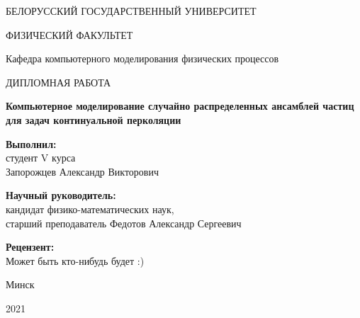 \begin{titlepage}
\begin{center}
БЕЛОРУССКИЙ ГОСУДАРСТВЕННЫЙ УНИВЕРСИТЕТ

ФИЗИЧЕСКИЙ ФАКУЛЬТЕТ

Кафедра компьютерного моделирования физических процессов
\end{center}

\vspace{5cm}

\begin{center}
\LARGE {ДИПЛОМНАЯ РАБОТА}
\end{center}

\begin{center}
\LARGE \bf{Компьютерное моделирование случайно распределенных ансамблей частиц для задач континуальной перколяции}
\end{center}

\vspace{2cm}

\large
\begin{flushright}
\textbf{Выполнил:}\\
студент V курса \\
Запорожцев Александр Викторович\\

\vspace{0.5cm}

\textbf{Научный руководитель:}\\
кандидат физико-математических наук, \\
старший преподаватель Федотов Александр Сергеевич
\end{flushright}
\vspace{0.5cm}

\begin{flushright}
\textbf{Рецензент:}\\
Может быть кто-нибудь будет :)  
\end{flushright}

\vspace{1cm}

\begin{center}
Минск 

2021
\end{center}

\end{titlepage}
